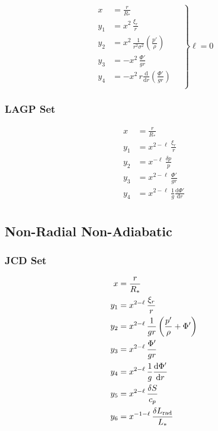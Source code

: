 \documentclass[fleqn]{article}
\newcommand{\diff}{\ensuremath{\mathrm{d}}}
\newcommand{\Rstar}{\ensuremath{R_{\ast}}}
\newcommand{\Lrad}{\ensuremath{L_{\rm rad}}}
\newcommand{\Lstar}{\ensuremath{L_{\ast}}}
\begin{document}
{\begin{equation*}
\left.
\begin{aligned}
x     &= \frac{r}{\Rstar} \\
y_{1} &= x^{2}\, \frac{\xi_{r}}{r} \\
y_{2} &= x^{2}\, \frac{1}{r^{2} \sigma^{2}} \left( \frac{p'}{\rho} \right) \\
y_{3} &= - x^{2}\, \frac{\Phi'}{gr} \\
y_{4} &= - x^{2}\, r \frac{\diff}{\diff r} \left( \frac{\Phi'}{g r} \right) \\
\end{aligned}
\quad \right\} \ell = 0
\end{equation*}

\subsubsection*{LAGP Set}

\begin{align*}
x     &= \frac{r}{\Rstar} \\
y_{1} &= x^{2-\ell}\, \frac{\xi_{r}}{r} \\
y_{2} &= x^{ -\ell}\, \frac{\delta p}{p} \\
y_{3} &= x^{2-\ell}\, \frac{\Phi'}{gr} \\
y_{4} &= x^{2-\ell}\, \frac{1}{g} \frac{\diff \Phi'}{\diff r} \\
\end{align*}


\subsection*{Non-Radial Non-Adiabatic}

\subsubsection*{JCD Set}

\begin{align*}
x     &= \frac{r}{\Rstar} \\
y_{1} &= x^{2-\ell}\, \frac{\xi_{r}}{r} \\
y_{2} &= x^{2-\ell}\, \frac{1}{gr} \left( \frac{p'}{\rho} + \Phi' \right)\\
y_{3} &= x^{2-\ell}\, \frac{\Phi'}{gr}\\
y_{4} &= x^{2-\ell}\, \frac{1}{g} \frac{\diff \Phi'}{\diff r}\\
y_{5} &= x^{2-\ell}\, \frac{\delta S}{c_{p}}\\
y_{6} &= x^{-1-\ell}\, \frac{\delta \Lrad}{\Lstar}
\end{align*}

}
\end{document}

